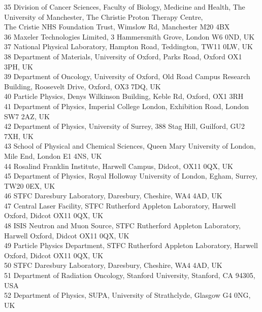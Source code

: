 {\begin{tabbing}
     35 \> Division of Cancer Sciences, Faculty of Biology, Medicine and Health, The University of Manchester, The Christie Proton Therapy Centre, \\ \> The Cristie NHS Foundation Trust, Wimslow Rd, Manchester M20 4BX\\
     36 \> Maxeler Technologies Limited, 3 Hammersmith Grove, London W6 0ND, UK\\
     37 \> National Physical Laboratory, Hampton Road, Teddington, TW11 0LW, UK\\
     38 \> Department of Materials, University of Oxford, Parks Road, Oxford OX1 3PH, UK\\
     39 \> Department of Oncology, University of Oxford, Old Road Campus Research Building, Roosevelt Drive, Oxford, OX3 7DQ, UK\\
     40 \> Particle Physics, Denys Wilkinson Building, Keble Rd, Oxford, OX1 3RH\\
     41 \> Department of Physics, Imperial College London, Exhibition Road, London SW7 2AZ, UK\\
     42 \> Department of Physics, University of Surrey, 388 Stag Hill, Guilford, GU2 7XH, UK\\
     43 \> School of Physical and Chemical Sciences, Queen Mary University of London, Mile End, London E1 4NS, UK\\
     44 \> Rosalind Franklin Institute, Harwell Campus, Didcot, OX11 0QX, UK\\
     45 \> Department of Physics, Royal Holloway University of London, Egham, Surrey, TW20 0EX, UK\\
     46 \> STFC Daresbury Laboratory, Daresbury, Cheshire, WA4 4AD, UK\\
     47 \> Central Laser Facility, STFC Rutherford Appleton Laboratory, Harwell Oxford, Didcot OX11 0QX, UK\\
     48 \> ISIS Neutron and Muon Source, STFC Rutherford Appleton Laboratory, Harwell Oxford, Didcot OX11 0QX, UK\\
     49 \> Particle Physics Department, STFC Rutherford Appleton Laboratory, Harwell Oxford, Didcot OX11 0QX, UK\\
     50 \> STFC Daresbury Laboratory, Daresbury, Cheshire, WA4 4AD, UK\\
     51 \> Department of Radiation Oncology, Stanford University, Stanford, CA 94305, USA\\
     52 \> Department of Physics, SUPA, University of Strathclyde, Glasgow G4 0NG, UK\\

\end{tabbing}}
